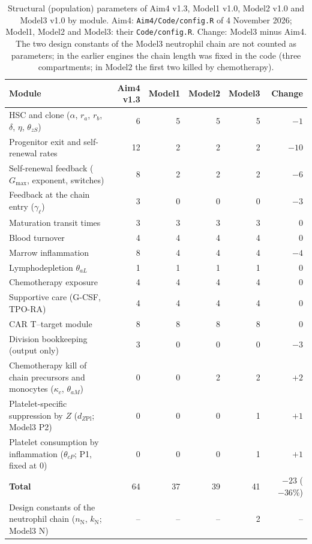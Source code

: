 \begin{table}[!htbp]
\centering
\small
\setlength{\tabcolsep}{3.5pt}
\caption{Structural (population) parameters of Aim4 v1.3, Model1 v1.0, Model2 v1.0 and Model3 v1.0 by module. Aim4: \texttt{Aim4/Code/config.R} of 4 November 2026; Model1, Model2 and Model3: their \texttt{Code/config.R}. Change: Model3 minus Aim4. The two design constants of the Model3 neutrophil chain are not counted as parameters; in the earlier engines the chain length was fixed in the code (three compartments; in Model2 the first two killed by chemotherapy).}
\label{tab:reduction}
\begin{tabular}{>{\raggedright\arraybackslash}p{7.7cm}rrrrr}
\toprule
Module & Aim4 v1.3 & Model1 & Model2 & Model3 & Change \\
\midrule
HSC and clone ($\alpha$, $r_a$, $r_b$, $\delta$, $\eta$, $\theta_{zS}$) & 6 & 5 & 5 & 5 & $-1$ \\
Progenitor exit and self-renewal rates & 12 & 2 & 2 & 2 & $-10$ \\
Self-renewal feedback ($G_{\max}$, exponent, switches) & 8 & 2 & 2 & 2 & $-6$ \\
Feedback at the chain entry ($\gamma_\ell$) & 3 & 0 & 0 & 0 & $-3$ \\
Maturation transit times & 3 & 3 & 3 & 3 & 0 \\
Blood turnover & 4 & 4 & 4 & 4 & 0 \\
Marrow inflammation & 8 & 4 & 4 & 4 & $-4$ \\
Lymphodepletion $\theta_{aL}$ & 1 & 1 & 1 & 1 & 0 \\
Chemotherapy exposure & 4 & 4 & 4 & 4 & 0 \\
Supportive care (G-CSF, TPO-RA) & 4 & 4 & 4 & 4 & 0 \\
CAR T--target module & 8 & 8 & 8 & 8 & 0 \\
Division bookkeeping (output only) & 3 & 0 & 0 & 0 & $-3$ \\
Chemotherapy kill of chain precursors and monocytes ($\kappa_c$, $\theta_{aM}$) & 0 & 0 & 2 & 2 & $+2$ \\
Platelet-specific suppression by $Z$ ($d_{Z\mathrm{Pl}}$; Model3 P2) & 0 & 0 & 0 & 1 & $+1$ \\
Platelet consumption by inflammation ($\theta_{cP}$; P1, fixed at 0) & 0 & 0 & 0 & 1 & $+1$ \\
\midrule
\textbf{Total} & 64 & 37 & 39 & 41 & $-23$ ($-36\%$) \\
Design constants of the neutrophil chain ($n_{\mathrm{N}}$, $k_{\mathrm{N}}$; Model3 N) & -- & -- & -- & 2 & -- \\
\bottomrule
\end{tabular}
\end{table}
